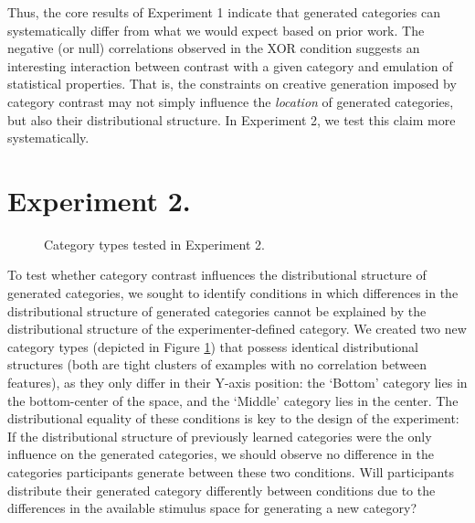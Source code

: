 \documentclass[12pt]{article}
\begin{document}
\begin{flushleft}
Thus, the core results of Experiment 1 indicate that generated categories can systematically differ from what we would expect based on prior work. The negative (or null) correlations observed in the XOR condition suggests an interesting interaction between contrast with a given category and emulation of statistical properties. That is, the constraints on creative generation imposed by category contrast may not simply influence the {\em location} of generated categories, but also their distributional structure. In Experiment 2, we test this claim more systematically.


\section{Experiment 2.}

\begin{figure}
    \begin{center}
    
    \caption{Category types tested in Experiment 2.}
    \label{fig:e2-conditions}
    \end{center}
\end{figure}

To test whether category contrast influences the distributional structure of generated categories, we sought to identify conditions in which differences in the distributional structure of generated categories cannot be explained by the distributional structure of the experimenter-defined category. We created two new category types (depicted in Figure \ref{fig:e2-conditions}) that possess identical distributional structures (both are tight clusters of examples with no correlation between features), as they only differ in their Y-axis position: the `Bottom' category lies in the bottom-center of the space, and the `Middle' category lies in the center. The distributional equality of these conditions is key to the design of the experiment: If the distributional structure of previously learned categories were the only influence on the generated categories, we should observe no difference in the categories participants generate between these two conditions. Will participants distribute their generated category differently between conditions due to the differences in the available stimulus space for generating a new category?


\end{flushleft}
\end{document}

